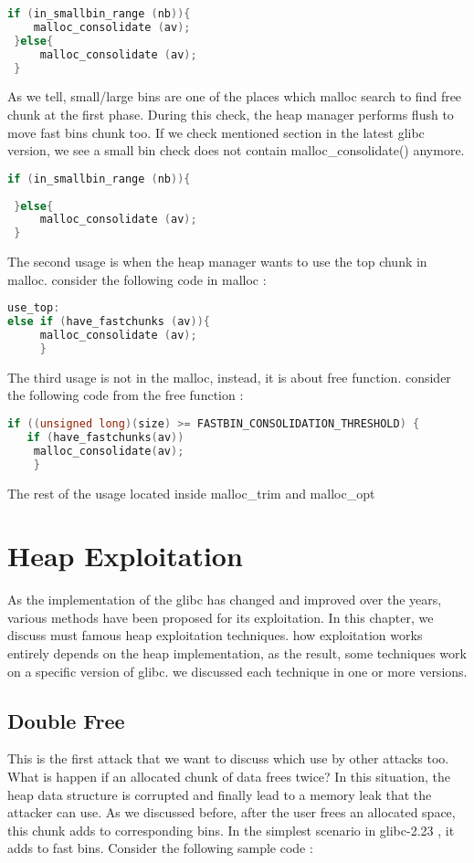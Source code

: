 \documentclass{masterthesis}
\newcommand*\libc{glibc}
\newcommand*\fb{fast bins}
\begin{document}
\begin{lstlisting}[language=c,frame=tlrb]
 if (in_smallbin_range (nb)){
 	malloc_consolidate (av);
 }else{
	 malloc_consolidate (av);
 }
\end{lstlisting}

As we tell, small/large bins are one of the places which malloc search to find free chunk at the first phase. During this check, the heap manager performs flush to move \fb{} chunk too. If we check mentioned section in the latest \libc{} version, we see a small bin check does not contain malloc\_consolidate() anymore.

\begin{lstlisting}[language=c,frame=tlrb]
 if (in_smallbin_range (nb)){
 	 
 }else{
	 malloc_consolidate (av);
 }
\end{lstlisting}

The second usage is when the heap manager wants to use the top chunk in malloc. consider the following code in malloc :

\begin{lstlisting}[language=c,frame=tlrb]
use_top:
else if (have_fastchunks (av)){
     malloc_consolidate (av);
     }
\end{lstlisting}

The third usage is not in the malloc, instead, it is about free function. consider the following code from the free function :

\begin{lstlisting}[language=c,frame=tlrb]
if ((unsigned long)(size) >= FASTBIN_CONSOLIDATION_THRESHOLD) {
   if (have_fastchunks(av))
	malloc_consolidate(av);
	}
\end{lstlisting}

The rest of the usage located inside malloc\_trim and malloc\_opt

\chapter{Heap Exploitation }

As the implementation of the \libc{} has changed and improved over the years, various methods have been proposed for its exploitation. In this chapter, we discuss must famous heap exploitation techniques. how exploitation works entirely depends on the heap implementation, as the result, some techniques work on a specific version of \libc{}. we discussed each technique in one or more versions.

\section{Double Free}
This is the first attack that we want to discuss which use by other attacks too. What is happen if an allocated chunk of data frees twice? In this situation, the heap data structure is corrupted and finally lead to a memory leak that the attacker can use. As we discussed before, after the user frees an allocated space, this chunk adds to corresponding bins. In the simplest scenario in \libc{-2.23} , it adds to fast bins. Consider the following sample code :
\end{document}

